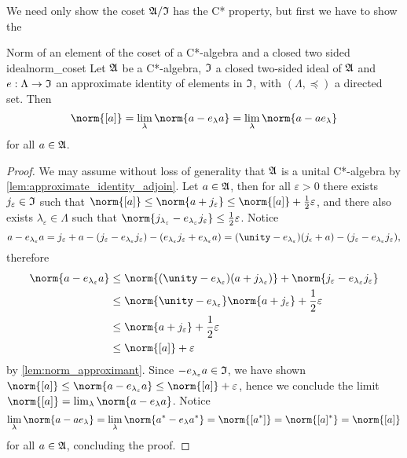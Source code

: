 We need only show the coset \(\mathfrak{A}/\mathfrak{I}\) has the C* property, but first we have to show the
\begin{lemma}{Norm of an element of the coset of a C*-algebra and a closed two sided ideal}{norm_coset}
    Let \(\mathfrak{A}\) be a C*-algebra, \(\mathfrak{I}\) a closed two-sided ideal of \(\mathfrak{A}\) and \(e : \Lambda \to \mathfrak{I}\) an approximate identity of elements in \(\mathfrak{I}\), with \((\Lambda, \preceq)\) a directed set. Then
    \begin{equation*}
        \norm{[a]} = \lim_{\lambda}{\norm{a - e_{\lambda} a}}= \lim_{\lambda}{\norm{a - a e_{\lambda}}}
    \end{equation*}
    for all \(a \in \mathfrak{A}\).
\end{lemma}
\begin{proof}
    We may assume without loss of generality that \(\mathfrak{A}\) is a unital C*-algebra by \cref{lem:approximate_identity_adjoin}. Let \(a \in \mathfrak{A}\), then for all \(\varepsilon > 0\) there exists \(j_{\varepsilon} \in \mathfrak{I}\) such that \(\norm{[a]} \leq \norm{a + j_{\varepsilon}} \leq \norm{[a]} + \frac12\varepsilon\), and there also exists \(\lambda_{\varepsilon} \in \Lambda\) such that \(\norm{j_{\lambda_{\varepsilon}} - e_{\lambda_{\varepsilon}}j_{\varepsilon}} \leq \frac12\varepsilon\). Notice
    \begin{equation*}
        a - e_{\lambda_{\varepsilon}}a = j_{\varepsilon} + a - (j_{\varepsilon} - e_{\lambda_{\varepsilon}}j_{\varepsilon}) - (e_{\lambda_{\varepsilon}}j_{\varepsilon} + e_{\lambda_{\varepsilon}}a) = (\unity - e_{\lambda_{\varepsilon}})(j_{\epsilon} + a) - (j_{\varepsilon} - e_{\lambda_{\varepsilon}} j_{\varepsilon}),
    \end{equation*}
    therefore
    \begin{align*}
        \norm{a - e_{\lambda_{\varepsilon}}a} &\leq \norm{(\unity - e_{\lambda_{\varepsilon}})(a + j_{\lambda_{\varepsilon}})} + \norm{j_{\varepsilon} - e_{\lambda_{\varepsilon}}j_{\varepsilon}}\\
                                              &\leq \norm{\unity - e_{\lambda_{\varepsilon}}}\norm{a + j_{\varepsilon}} + \frac12 \varepsilon\\
                                              &\leq \norm{a + j_{\varepsilon}} + \frac12 \varepsilon\\
                                              &\leq \norm{[a]} + \varepsilon
    \end{align*}
    by \cref{lem:norm_approximant}. Since \(-e_{\lambda_{\varepsilon}}a \in \mathfrak{I}\), we have shown \(\norm{[a]} \leq \norm{a - e_{\lambda_{\varepsilon}}a} \leq \norm{[a]} + \varepsilon\), hence we conclude the limit \(\norm{[a]} = \lim_{\lambda}{\norm{a - e_{\lambda}a}}\). Notice
    \begin{equation*}
        \lim_{\lambda}{\norm{a - a e_{\lambda}}}= \lim_{\lambda}{\norm{a^* - e_{\lambda}a^*}} = \norm{[a^*]} = \norm{[a]^*} = \norm{[a]}
    \end{equation*}
    for all \(a \in \mathfrak{A}\), concluding the proof.
\end{proof}

